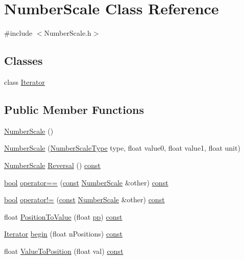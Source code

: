 \hypertarget{class_number_scale}{}\section{Number\+Scale Class Reference}
\label{class_number_scale}


{\ttfamily \#include $<$Number\+Scale.\+h$>$}

\subsection*{Classes}
\begin{DoxyCompactItemize}
\item 
class \hyperlink{class_number_scale_1_1_iterator}{Iterator}
\end{DoxyCompactItemize}
\subsection*{Public Member Functions}
\begin{DoxyCompactItemize}
\item 
\hyperlink{class_number_scale_a6d9acf11aee29ec19619091acf40a36d}{Number\+Scale} ()
\item 
\hyperlink{class_number_scale_adaabb641ce16ac4ef509cc20e97272ed}{Number\+Scale} (\hyperlink{_number_scale_8h_a29bce02ed76d27dfa11771d3200a2bd2}{Number\+Scale\+Type} type, float value0, float value1, float unit)
\item 
\hyperlink{class_number_scale}{Number\+Scale} \hyperlink{class_number_scale_a83c46c134475796687e8ba14ef1f24ca}{Reversal} () \hyperlink{getopt1_8c_a2c212835823e3c54a8ab6d95c652660e}{const} 
\item 
\hyperlink{mac_2config_2i386_2lib-src_2libsoxr_2soxr-config_8h_abb452686968e48b67397da5f97445f5b}{bool} \hyperlink{class_number_scale_aac98d1937e26f25df1a919d28f5e9bac}{operator==} (\hyperlink{getopt1_8c_a2c212835823e3c54a8ab6d95c652660e}{const} \hyperlink{class_number_scale}{Number\+Scale} \&other) \hyperlink{getopt1_8c_a2c212835823e3c54a8ab6d95c652660e}{const} 
\item 
\hyperlink{mac_2config_2i386_2lib-src_2libsoxr_2soxr-config_8h_abb452686968e48b67397da5f97445f5b}{bool} \hyperlink{class_number_scale_ab218f8752b40cca4d6a4ec114b2e6204}{operator!=} (\hyperlink{getopt1_8c_a2c212835823e3c54a8ab6d95c652660e}{const} \hyperlink{class_number_scale}{Number\+Scale} \&other) \hyperlink{getopt1_8c_a2c212835823e3c54a8ab6d95c652660e}{const} 
\item 
float \hyperlink{class_number_scale_a6068a19297cb9faafc0141beb1ff9f7a}{Position\+To\+Value} (float \hyperlink{xlpp_8c_ae9f2a1c4ccbaf7dae02c0330a1b54e22}{pp}) \hyperlink{getopt1_8c_a2c212835823e3c54a8ab6d95c652660e}{const} 
\item 
\hyperlink{class_number_scale_1_1_iterator}{Iterator} \hyperlink{class_number_scale_afa313b21d116e7e6499275394dc7b47d}{begin} (float n\+Positions) \hyperlink{getopt1_8c_a2c212835823e3c54a8ab6d95c652660e}{const} 
\item 
float \hyperlink{class_number_scale_a007f1093c973cd24b57e06b678613fd3}{Value\+To\+Position} (float val) \hyperlink{getopt1_8c_a2c212835823e3c54a8ab6d95c652660e}{const} 
\end{DoxyCompactItemize}
